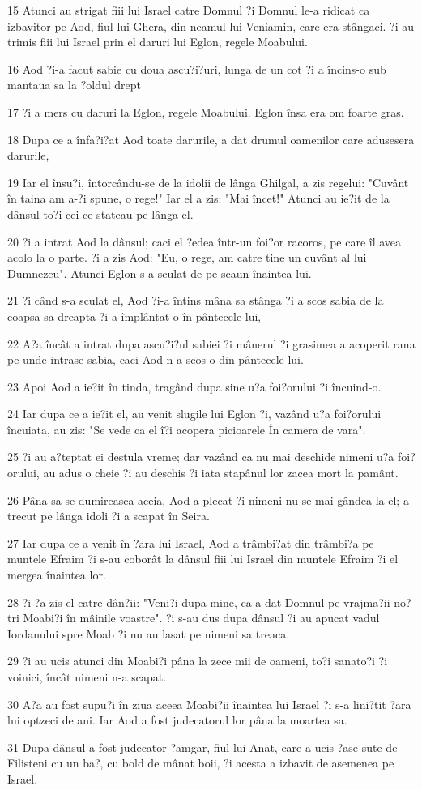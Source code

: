 \par 15 Atunci au strigat fiii lui Israel catre Domnul ?i Domnul le-a ridicat ca izbavitor pe Aod, fiul lui Ghera, din neamul lui Veniamin, care era stângaci. ?i au trimis fiii lui Israel prin el daruri lui Eglon, regele Moabului.
\par 16 Aod ?i-a facut sabie cu doua ascu?i?uri, lunga de un cot ?i a încins-o sub mantaua sa la ?oldul drept
\par 17 ?i a mers cu daruri la Eglon, regele Moabului. Eglon însa era om foarte gras.
\par 18 Dupa ce a înfa?i?at Aod toate darurile, a dat drumul oamenilor care adusesera darurile,
\par 19 Iar el însu?i, întorcându-se de la idolii de lânga Ghilgal, a zis regelui: "Cuvânt în taina am a-?i spune, o rege!" Iar el a zis: "Mai încet!" Atunci au ie?it de la dânsul to?i cei ce stateau pe lânga el.
\par 20 ?i a intrat Aod la dânsul; caci el ?edea într-un foi?or racoros, pe care îl avea acolo la o parte. ?i a zis Aod: "Eu, o rege, am catre tine un cuvânt al lui Dumnezeu". Atunci Eglon s-a sculat de pe scaun înaintea lui.
\par 21 ?i când s-a sculat el, Aod ?i-a întins mâna sa stânga ?i a scos sabia de la coapsa sa dreapta ?i a împlântat-o în pântecele lui,
\par 22 A?a încât a intrat dupa ascu?i?ul sabiei ?i mânerul ?i grasimea a acoperit rana pe unde intrase sabia, caci Aod n-a scos-o din pântecele lui.
\par 23 Apoi Aod a ie?it în tinda, tragând dupa sine u?a foi?orului ?i încuind-o.
\par 24 Iar dupa ce a ie?it el, au venit slugile lui Eglon ?i, vazând u?a foi?orului încuiata, au zis: "Se vede ca el î?i acopera picioarele În camera de vara".
\par 25 ?i au a?teptat ei destula vreme; dar vazând ca nu mai deschide nimeni u?a foi?orului, au adus o cheie ?i au deschis ?i iata stapânul lor zacea mort la pamânt.
\par 26 Pâna sa se dumireasca aceia, Aod a plecat ?i nimeni nu se mai gândea la el; a trecut pe lânga idoli ?i a scapat în Seira.
\par 27 Iar dupa ce a venit în ?ara lui Israel, Aod a trâmbi?at din trâmbi?a pe muntele Efraim ?i s-au coborât la dânsul fiii lui Israel din muntele Efraim ?i el mergea înaintea lor.
\par 28 ?i ?a zis el catre dân?ii: "Veni?i dupa mine, ca a dat Domnul pe vrajma?ii no?tri Moabi?i în mâinile voastre". ?i s-au dus dupa dânsul ?i au apucat vadul Iordanului spre Moab ?i nu au lasat pe nimeni sa treaca.
\par 29 ?i au ucis atunci din Moabi?i pâna la zece mii de oameni, to?i sanato?i ?i voinici, încât nimeni n-a scapat.
\par 30 A?a au fost supu?i în ziua aceea Moabi?ii înaintea lui Israel ?i s-a lini?tit ?ara lui optzeci de ani. Iar Aod a fost judecatorul lor pâna la moartea sa.
\par 31 Dupa dânsul a fost judecator ?amgar, fiul lui Anat, care a ucis ?ase sute de Filisteni cu un ba?, cu bold de mânat boii, ?i acesta a izbavit de asemenea pe Israel.

